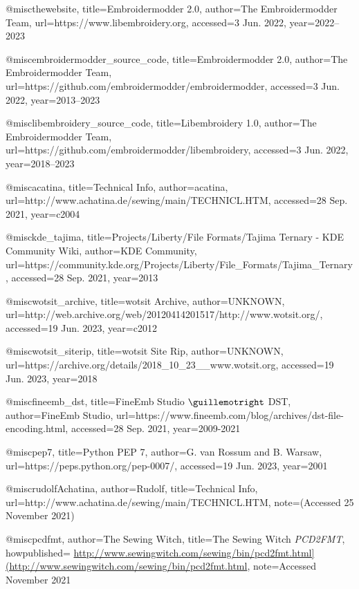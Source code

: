 @misc{thewebsite,
    title={Embroidermodder 2.0},
    author={The Embroidermodder Team},
    url={https://www.libembroidery.org},
    accessed={3 Jun. 2022},
    year={2022--2023}
}

@misc{embroidermodder_source_code,
    title={Embroidermodder 2.0},
    author={The Embroidermodder Team},
    url={https://github.com/embroidermodder/embroidermodder},
    accessed={3 Jun. 2022},
    year={2013--2023}
}

@misc{libembroidery_source_code,
    title={Libembroidery 1.0},
    author={The Embroidermodder Team},
    url={https://github.com/embroidermodder/libembroidery},
    accessed={3 Jun. 2022},
    year={2018--2023}
}

@misc{acatina,
    title={Technical Info},
    author={acatina},
    url={http://www.achatina.de/sewing/main/TECHNICL.HTM},
    accessed={28 Sep. 2021},
    year={c2004}
}

@misc{kde_tajima,
    title={Projects/Liberty/File Formats/Tajima Ternary - KDE Community Wiki},
    author={KDE Community},
    url={https://community.kde.org/Projects/Liberty/File_Formats/Tajima_Ternary},
    accessed={28 Sep. 2021},
    year={2013}
}

@misc{wotsit_archive,
    title={wotsit Archive},
    author={UNKNOWN},
    url={http://web.archive.org/web/20120414201517/http://www.wotsit.org/},
    accessed={19 Jun. 2023},
    year={c2012}
}

@misc{wotsit_siterip,
    title={wotsit Site Rip},
    author={UNKNOWN},
    url={https://archive.org/details/2018_10_23__www.wotsit.org},
    accessed={19 Jun. 2023},
    year={2018}
}

@misc{fineemb_dst,
    title={FineEmb Studio $\guillemotright$ DST},
    author={FineEmb Studio},
    url={https://www.fineemb.com/blog/archives/dst-file-encoding.html},
    accessed={28 Sep. 2021},
    year={2009-2021}
}

@misc{pep7,
    title={Python PEP 7},
    author={G. van Rossum and B. Warsaw},
    url={https://peps.python.org/pep-0007/},
    accessed={19 Jun. 2023},
    year={2001}
}

@misc{rudolfAchatina,
    author={Rudolf},
    title={Technical Info},
    url={http://www.achatina.de/sewing/main/TECHNICL.HTM},
    note={(Accessed 25 November 2021)}
}

@misc{pcdfmt,
    author={The Sewing Witch},
    title={The Sewing Witch \emph{PCD2FMT}},
    howpublished={ \url{http://www.sewingwitch.com/sewing/bin/pcd2fmt.html](http://www.sewingwitch.com/sewing/bin/pcd2fmt.html}},
    note={Accessed November 2021}
}

